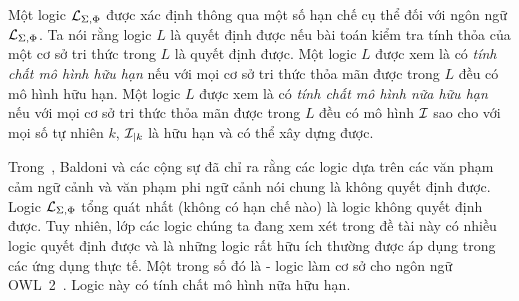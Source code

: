Một logic $\mathcal{L}_{\Sigma,\Phi}$ được xác định thông qua một số hạn chế cụ thể đối với ngôn ngữ $\mathcal{L}_{\Sigma,\Phi}$. Ta nói rằng logic $L$ là quyết định được nếu bài toán kiểm tra tính thỏa của một cơ sở tri thức trong $L$ là quyết định được. 
%
Một logic $L$ được xem là có {\em tính chất mô hình hữu hạn} nếu với mọi cơ sở tri thức thỏa mãn được trong $L$ đều có mô hình hữu hạn.
%
Một logic $L$ được xem là có {\em tính chất mô hình nữa hữu hạn} nếu với mọi cơ sở tri thức thỏa mãn được trong $L$ đều có mô hình $\mathcal{I}$ sao cho với mọi số tự nhiên $k$, $\mathcal{I}_{\mid k}$ là hữu hạn và có thể xây dựng được.

Trong~\cite{Baldoni1998}, Baldoni và các cộng sự đã chỉ ra rằng các logic dựa trên các văn phạm cảm ngữ cảnh và văn phạm phi ngữ cảnh nói chung là không quyết định được.
Logic $\mathcal{L}_{\Sigma,\Phi}$ tổng quát nhất (không có hạn chế nào) là logic không quyết định được. Tuy nhiên, lớp các logic chúng ta đang xem xét trong đề tài này có nhiều logic quyết định được và là những logic rất hữu ích thường được áp dụng trong các ứng dụng thực tế. Một trong số đó là \SROIQ\;- logic làm cơ sở cho ngôn ngữ OWL~2~\cite{Horrocks2006}. Logic này có tính chất mô hình nữa hữu hạn.

